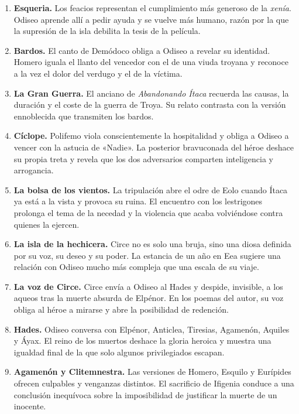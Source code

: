 \documentclass[11pt,a4paper]{article}
\begin{document}
\begin{enumerate}[label=\Roman*.,leftmargin=3.2em,itemsep=0.7em]
\item \textbf{Esqueria.}
Los feacios representan el cumplimiento más generoso de la \emph{xenía}.
Odiseo aprende allí a pedir ayuda y se vuelve más humano, razón por la que la
supresión de la isla debilita la tesis de la película.

\item \textbf{Bardos.}
El canto de Demódoco obliga a Odiseo a revelar su identidad. Homero iguala el
llanto del vencedor con el de una viuda troyana y reconoce a la vez el dolor
del verdugo y el de la víctima.

\item \textbf{La Gran Guerra.}
El anciano de \emph{Abandonando Ítaca} recuerda las causas, la duración y el
coste de la guerra de Troya. Su relato contrasta con la versión ennoblecida que
transmiten los bardos.

\item \textbf{Cíclope.}
Polifemo viola conscientemente la hospitalidad y obliga a Odiseo a vencer con
la astucia de «Nadie». La posterior bravuconada del héroe deshace su propia
treta y revela que los dos adversarios comparten inteligencia y arrogancia.

\item \textbf{La bolsa de los vientos.}
La tripulación abre el odre de Eolo cuando Ítaca ya está a la vista y provoca
su ruina. El encuentro con los lestrigones prolonga el tema de la necedad y la
violencia que acaba volviéndose contra quienes la ejercen.

\item \textbf{La isla de la hechicera.}
Circe no es solo una bruja, sino una diosa definida por su voz, su deseo y su
poder. La estancia de un año en Eea sugiere una relación con Odiseo mucho más
compleja que una escala de su viaje.

\item \textbf{La voz de Circe.}
Circe envía a Odiseo al Hades y despide, invisible, a los aqueos tras la
muerte absurda de Elpénor. En los poemas del autor, su voz obliga al héroe a mirarse y abre la
posibilidad de redención.

\item \textbf{Hades.}
Odiseo conversa con Elpénor, Anticlea, Tiresias, Agamenón, Aquiles y Áyax. El
reino de los muertos deshace la gloria heroica y muestra una igualdad final de
la que solo algunos privilegiados escapan.

\item \textbf{Agamenón y Clitemnestra.}
Las versiones de Homero, Esquilo y Eurípides ofrecen culpables y venganzas
distintos. El sacrificio de Ifigenia conduce a una conclusión inequívoca sobre
la imposibilidad de justificar la muerte de un inocente.


\end{enumerate}
\end{document}
